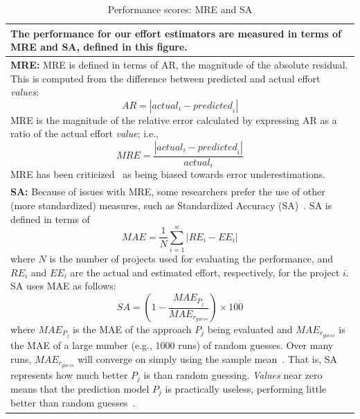 \documentclass[10pt,conference]{IEEEtran}
\begin{document}
\begin{table}
\caption{Performance scores: MRE and SA}\label{samre}
\begin{tabular}{|p{.95\linewidth}|}\hline
The performance   for our effort estimators are measured in terms of MRE and SA, defined in this figure.
\\\hline
{\bf MRE:}
MRE is defined in terms of 
AR,  the magnitude of the absolute residual. This is  computed from the difference between predicted and actual effort {\em values}:
\[
\mathit{AR} = |\mathit{actual}_i - \mathit{predicted}_i|
\] 
MRE is the magnitude of the relative error calculated by expressing AR as a ratio of the actual effort {\em value}; i.e., 
\[
\mathit{MRE} = \frac{|\mathit{actual}_i - \mathit{predicted}_i|}{\mathit{actual}_i}
\]
MRE has been criticized~\cite{foss2003simulation,kitchenham2001accuracy,korte2008confidence,port2008comparative,shepperd2000building,stensrud2003further} as being biased towards error underestimations. 
\\\hline
{\bf SA:}
Because of issues with MRE, some researchers prefer the 
use of other (more standardized) measures, such as  Standardized Accuracy (SA)~\cite{langdon2016exact,shepperd2012evaluating}.
SA is defined in terms of 
\[
\mathit{MAE}=\frac{1}{N}\sum_{i=1}^n|\mathit{RE}_i-\mathit{EE}_i|
\]
where $N$ is the number of projects used for evaluating the performance, and $\mathit{RE}_i$ and $\mathit{EE}_i$ are the actual and estimated effort, respectively, for the project $i$. 
SA uses MAE as follows:
\[
\mathit{SA} = (1-\frac{\mathit{MAE}_{P_{j}}}{\mathit{MAE}_{r_{guess}}})\times 100
\]
where $\mathit{MAE}_{P_{j}}$ is the MAE of the approach $P_j$ being evaluated and $\mathit{MAE}_{r_{\mathit{guess}}}$ is the MAE of a large number (e.g., 1000 runs) of random guesses. 
Over many runs,  $\mathit{MAE}_{r_{\mathit{guess}}}$ will converge on simply using the sample mean~\cite{shepperd2012evaluating}. That is, SA represents how much better $P_j$ is than random guessing. {\em Values} near zero means that the prediction model $P_j$ is practically useless, performing little better than  random guesses~\cite{shepperd2012evaluating}. \\\hline
\end{tabular}
\end{table}
\end{document}

